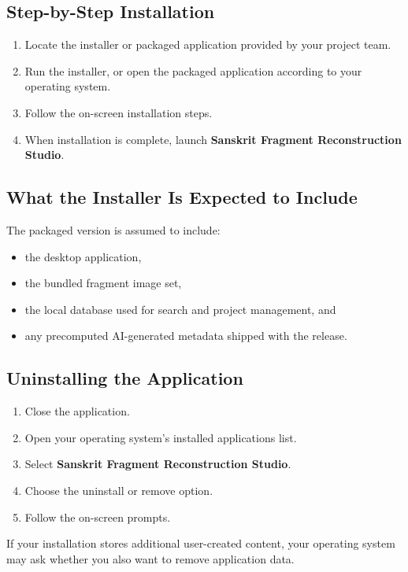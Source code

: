 \documentclass[12pt]{article}
\begin{document}
\subsection{Step-by-Step Installation}
\begin{enumerate}
  \item Locate the installer or packaged application provided by your project team.
  \item Run the installer, or open the packaged application according to your operating system.
  \item Follow the on-screen installation steps.
  \item When installation is complete, launch \textbf{Sanskrit Fragment Reconstruction Studio}.
\end{enumerate}

\subsection{What the Installer Is Expected to Include}
The packaged version is assumed to include:
\begin{itemize}
  \item the desktop application,
  \item the bundled fragment image set,
  \item the local database used for search and project management, and
  \item any precomputed AI-generated metadata shipped with the release.
\end{itemize}

\subsection{Uninstalling the Application}
\begin{enumerate}
  \item Close the application.
  \item Open your operating system's installed applications list.
  \item Select \textbf{Sanskrit Fragment Reconstruction Studio}.
  \item Choose the uninstall or remove option.
  \item Follow the on-screen prompts.
\end{enumerate}

If your installation stores additional user-created content, your operating system may ask whether you also want to remove application data.
\end{document}
